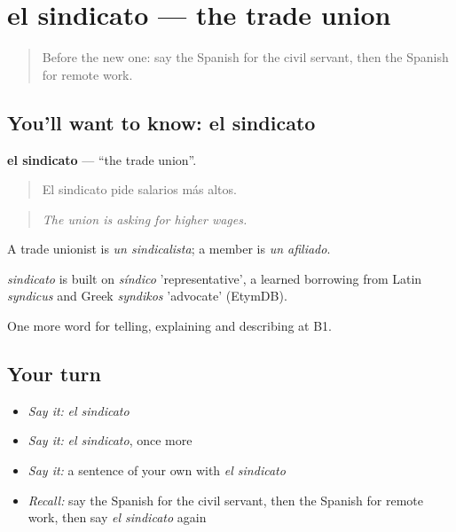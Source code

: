 \section[el sindicato]{el sindicato — the trade union}

\label{lesson:ES-C591-sindicato}



\begin{quote}
Before the new one: say the Spanish for the civil servant, then the Spanish for remote work.
\end{quote}

\subsection*{You'll want to know: el sindicato}
\textbf{el sindicato} — \textquotedblleft{}the trade union\textquotedblright{}.

\begin{quote}
El sindicato pide salarios más altos.
\end{quote}

\begin{quote}
\emph{The union is asking for higher wages.}
\end{quote}

A trade unionist is \emph{un sindicalista}; a member is \emph{un afiliado}.

\begin{cousinweb}
\emph{sindicato} is built on \emph{síndico} 'representative', a learned borrowing from Latin \emph{syndicus} and Greek \emph{syndikos} 'advocate' (EtymDB).
\end{cousinweb}

\begin{grammarlens}[title={What you've built}]
One more word for telling, explaining and describing at B1.
\end{grammarlens}

\subsection*{Your turn}
\begin{itemize}
\raggedright
  \item \emph{Say it:} \emph{el sindicato}
  \item \emph{Say it:} \emph{el sindicato}, once more
  \item \emph{Say it:} a sentence of your own with \emph{el sindicato}
  \item \emph{Recall:} say the Spanish for the civil servant, then the Spanish for remote work, then say \emph{el sindicato} again
\end{itemize}

